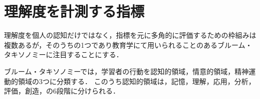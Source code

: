 \section{理解度を計測する指標}
理解度を個人の認知だけではなく，指標を元に多角的に評価するための枠組みは複数あるが，そのうちの1つであり教育学にて用いられることのあるブルーム・タキソノミー\cite{bib:anderson}に注目することにする．

ブルーム・タキソノミーでは，学習者の行動を認知的領域，情意的領域，精神運動的領域の3つに分類する．
このうち認知的領域は，記憶，理解，応用，分析，評価，創造，の6段階に分けられる．
